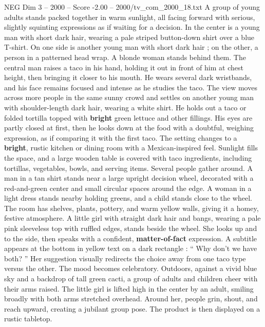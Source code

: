 \begin{textsample}{NEG Dim 3 – 2000 – Score -2.00 – 2000/tv\_com\_2000\_18.txt}  \label{ex:f3_neg_040}
A group of young adults stands packed together in warm sunlight, all facing forward with serious, slightly squinting expressions as if waiting for a decision.
In the center is a young man with short dark hair, wearing a pale striped button-down shirt over a blue T-shirt.
On one side is another young man with short dark hair ; on the other, a person in a patterned head wrap.
A blonde woman stands behind them.
The central man raises a taco in his hand, holding it out in front of him at chest height, then bringing it closer to his mouth.
He wears several dark wristbands, and his face remains focused and intense as he studies the taco.
The view moves across more people in the same sunny crowd and settles on another young man with shoulder-length dark hair, wearing a white shirt.
He holds out a taco or folded tortilla topped with \textbf{bright} green lettuce and other fillings.
His eyes are partly closed at first, then he looks down at the food with a doubtful, weighing expression, as if comparing it with the first taco.
The setting changes to a \textbf{bright}, rustic kitchen or dining room with a Mexican-inspired feel.
Sunlight fills the space, and a large wooden table is covered with taco ingredients, including tortillas, vegetables, bowls, and serving items.
Several people gather around.
A man in a tan shirt stands near a large upright decision wheel, decorated with a red-and-green center and small circular spaces around the edge.
A woman in a light dress stands nearby holding greens, and a child stands close to the wheel.
The room has shelves, plants, pottery, and warm yellow walls, giving it a homey, festive atmosphere.
A little girl with straight dark hair and bangs, wearing a pale pink sleeveless top with ruffled edges, stands beside the wheel.
She looks up and to the side, then speaks with a confident, \textbf{matter-of-fact} expression.
A subtitle appears at the bottom in yellow text on a dark rectangle : “ Why don't we have both? ” Her suggestion visually redirects the choice away from one taco type versus the other.
The mood becomes celebratory.
Outdoors, against a vivid blue sky and a backdrop of tall green cacti, a group of adults and children cheer with their arms raised.
The little girl is lifted high in the center by an adult, smiling broadly with both arms stretched overhead.
Around her, people grin, shout, and reach upward, creating a jubilant group pose.
The product is then displayed on a rustic tabletop.

\end{textsample}
